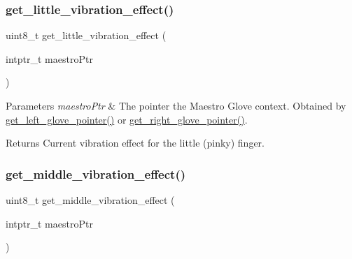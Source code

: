 \subsubsection{\texorpdfstring{get\+\_\+little\+\_\+vibration\+\_\+effect()}{get\_little\_vibration\_effect()}}
{\footnotesize\ttfamily uint8\+\_\+t get\+\_\+little\+\_\+vibration\+\_\+effect (\begin{DoxyParamCaption}\item[{intptr\+\_\+t}]{maestro\+Ptr }\end{DoxyParamCaption})}


\begin{DoxyParams}{Parameters}
{\em maestro\+Ptr} & The pointer the Maestro Glove context. Obtained by \hyperlink{group__glove_management_ga63ce3c99d4a8b8db851b22af9185764e}{get\+\_\+left\+\_\+glove\+\_\+pointer()} or \hyperlink{group__glove_management_ga9b8fd9d91aeac3f8da50f7a7eba0c32b}{get\+\_\+right\+\_\+glove\+\_\+pointer()}. \\
\hline
\end{DoxyParams}
\begin{DoxyReturn}{Returns}
Current vibration effect for the little (pinky) finger. 
\end{DoxyReturn}
\mbox{\label{group__vibration_control_ga3d474e4b3c72158eff250da56a814472}} 
\subsubsection{\texorpdfstring{get\+\_\+middle\+\_\+vibration\+\_\+effect()}{get\_middle\_vibration\_effect()}}
{\footnotesize\ttfamily uint8\+\_\+t get\+\_\+middle\+\_\+vibration\+\_\+effect (\begin{DoxyParamCaption}\item[{intptr\+\_\+t}]{maestro\+Ptr }\end{DoxyParamCaption})}


